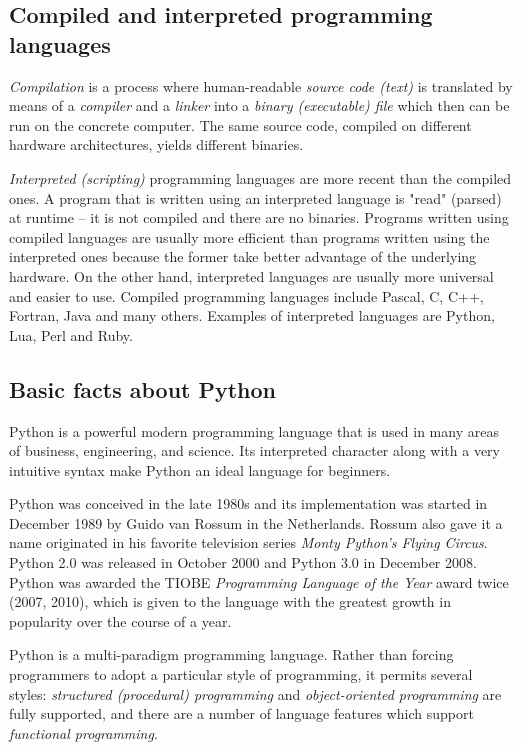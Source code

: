 \documentclass[article,A4,12pt]{llncs}
\begin{document}
\subsection{Compiled and interpreted programming languages}

{\em Compilation} is a process where human-readable {\em source code (text)} is translated by
means of a {\em compiler} and a {\em linker}
into a {\em binary (executable) file} which then can be run on the concrete computer. The same 
source code, compiled on different hardware architectures, yields different binaries. 

{\em Interpreted (scripting)} programming languages are more recent than the compiled ones. 
A program that is written using an interpreted language is "read" (parsed) at runtime -- it is 
not compiled and there are no binaries. Programs 
written using compiled languages are usually more efficient than programs written using the interpreted 
ones because the former take better advantage of the underlying hardware. On the other hand,
interpreted languages are usually more universal and easier to use. Compiled 
programming languages include Pascal, C, C++, Fortran, Java and many others. Examples of interpreted 
languages are Python, Lua, Perl and Ruby. 

\subsection{Basic facts about Python}

Python is a powerful modern programming language that is used in many areas of business, 
engineering, and science. Its interpreted character along with a very intuitive syntax make Python an 
ideal language for beginners. 

Python was conceived in the late 1980s and its implementation was started in December 1989
by Guido van Rossum in the Netherlands. Rossum also gave it a name originated
in his favorite television series {\em Monty Python's Flying Circus}.
Python 2.0 was released in October 2000 and Python 3.0 in December 2008. Python was
awarded the TIOBE {\em Programming Language of the Year} award twice (2007, 2010), which is 
given to the language with the greatest growth in popularity over the course of a year.

Python is a multi-paradigm programming language. Rather than forcing programmers to 
adopt a particular style of programming, it permits several styles: {\em structured (procedural) 
programming} and {\em object-oriented programming} are fully supported, and there are a number 
of language features which support {\em functional programming}. 
\end{document}
